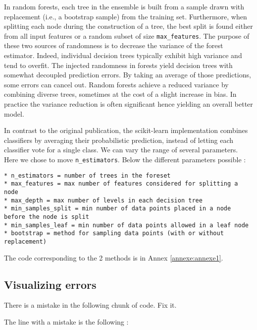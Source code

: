 \documentclass[10pt,a4paper]{article}
\theoremstyle{break}
\begin{document}
In random forests, each tree in the ensemble is built from a sample drawn with replacement (i.e., a bootstrap sample) from the training set. Furthermore, when splitting each node during the construction of a tree, the best split is found either from all input features or a random subset of size \texttt{max\_features}. The purpose of these two sources of randomness is to decrease the variance of the forest estimator. Indeed, individual decision trees typically exhibit high variance and tend to overfit. The injected randomness in forests yield decision trees with somewhat decoupled prediction errors. By taking an average of those predictions, some errors can cancel out. Random forests achieve a reduced variance by combining diverse trees, sometimes at the cost of a slight increase in bias. In practice the variance reduction is often significant hence yielding an overall better model.

In contrast to the original publication, the scikit-learn implementation combines classifiers by averaging their probabilistic prediction, instead of letting each classifier vote for a single class. We can vary the range of several parameters. Here we chose to move \texttt{n\_estimators}. Below the different parameters possible :

\begin{verbatim}
* n_estimators = number of trees in the foreset
* max_features = max number of features considered for splitting a node
* max_depth = max number of levels in each decision tree
* min_samples_split = min number of data points placed in a node before the node is split
* min_samples_leaf = min number of data points allowed in a leaf node
* bootstrap = method for sampling data points (with or without replacement)
\end{verbatim}

The code corresponding to the 2 methods is in Annex \ref{annexe:annexe1}.

\hypertarget{visualizing-errors}{%
\subsection{Visualizing errors}\label{visualizing-errors}}

\begin{tcolorbox}

There is a mistake in the following chunk of code. Fix it.

\end{tcolorbox}

The line with a mistake is the following :
\end{document}
